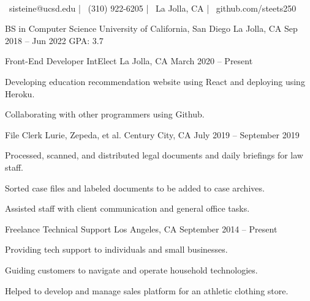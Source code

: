 \documentclass[]{awesome-cv}
\begin{document}
    
\begin{center}
	  \\
	\vspace{2mm}
	{\faEnvelope\ sisteine@ucsd.edu} | {\faMobile\ (310) 922-6205} | {\faMapMarker\ La Jolla, CA} | {\faLink\ github.com/steets250}
\end{center}
\begin{cventries}
	\cventry
	{BS in Computer Science}
	{University of California, San Diego}
	{La Jolla, CA}
	{Sep 2018 – Jun 2022}
	{GPA: 3.7}
\end{cventries}

\vspace{-2mm}
\begin{cventries}
	\cventry
	{Front-End Developer}
	{IntElect}
	{La Jolla, CA}
	{March 2020 – Present}
	{\begin{cvitems}
		\item {Developing education recommendation website using React and deploying using Heroku.}
		\item {Collaborating with other programmers using Github.}
		\end{cvitems}}
	\cventry
	{File Clerk}
	{Lurie, Zepeda, et al.}
	{Century City, CA}
	{July 2019 – September 2019}
	{\begin{cvitems}
		\item {Processed, scanned, and distributed legal documents and daily briefings for law staff.}
		\item {Sorted case files and labeled documents to be added to case archives.}
		\item {Assisted staff with client communication and general office tasks.}
		\end{cvitems}}
	\cventry
	{Freelance}
	{Technical Support}
	{Los Angeles, CA}
	{September 2014 – Present}
	{\begin{cvitems}
		\item {Providing tech support to individuals and small businesses.}
		\item {Guiding customers to navigate and operate household technologies.}
		\item {Helped to develop and manage sales platform for an athletic clothing store.}
		\end{cvitems}}
	\vspace{-5mm}
\end{cventries}
\end{document}
